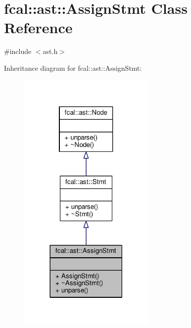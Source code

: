 \hypertarget{classfcal_1_1ast_1_1AssignStmt}{}\section{fcal\+:\+:ast\+:\+:Assign\+Stmt Class Reference}
\label{classfcal_1_1ast_1_1AssignStmt}


{\ttfamily \#include $<$ast.\+h$>$}



Inheritance diagram for fcal\+:\+:ast\+:\+:Assign\+Stmt\+:
\nopagebreak
\begin{figure}[H]
\begin{center}
\leavevmode
\includegraphics[width=189pt]{classfcal_1_1ast_1_1AssignStmt__inherit__graph}
\end{center}
\end{figure}


